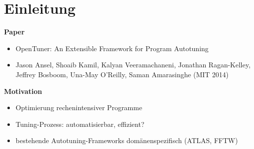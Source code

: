     \tuctwoheadlines

    

    \section{Einleitung}
    
  \begin{frame}
    \tableofcontents[currentsection]
  \end{frame}


  \begingroup
    \begin{frame}
    
    \textbf{Paper}
    \begin{itemize}
    
        \item OpenTuner: An Extensible Framework for Program Autotuning
        
        \item Jason Ansel, Shoaib Kamil, Kalyan Veeramachaneni, Jonathan Ragan-Kelley, Jeffrey Bosboom, Una-May O'Reilly, Saman Amarasinghe (MIT 2014)
        
    \end{itemize}
    
    \text{}
    
    \textbf{Motivation}
        
    \begin{itemize}
      \item Optimierung rechenintensiver Programme
      
      \item Tuning-Prozess: automatisierbar, effizient?
      
      \item bestehende Autotuning-Frameworks domänenspezifisch (ATLAS, FFTW)
      

\end{itemize}
\end{frame}
